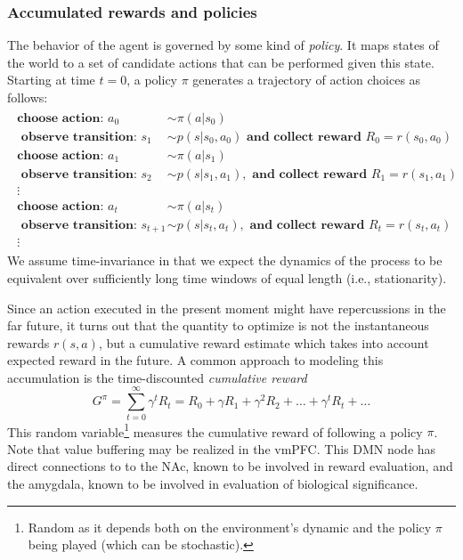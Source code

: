\documentclass[10pt,letterpaper]{article}
\begin{document}
\subsubsection{Accumulated rewards and policies}
The behavior of the agent is governed by some kind of \textit{policy}.
It maps states of the world to
a set of candidate actions that can be performed given this state. Starting at time $t=0$,
a policy $\pi$ generates a trajectory of action choices as follows:
\begin{eqnarray*}
  \begin{split}
    \textbf{choose action: }a_0 &\sim \pi(a|s_0)\\
    \textbf{ observe transition: }s_1 &\sim p(s|s_0,a_0)\textbf{ and collect reward }R_0 = r(s_0, a_0)\\
    \textbf{choose action: }a_1 &\sim \pi(a|s_1)\\
    \textbf{ observe transition: }s_2 &\sim p(s|s_1,a_1), \textbf{ and collect reward }R_1 = r(s_1, a_1)\\
    \vdots\\
    \textbf{choose action: }a_{t} &\sim \pi(a|s_{t})\\
    \textbf{ observe transition: }s_{t+1} &\sim p(s|s_{t},a_{t}), \textbf{ and collect reward }R_{t} = r(s_{t}, a_{t})\\
    \vdots
  \end{split}
\end{eqnarray*}
We assume time-invariance
in that we expect the dynamics of the process
to be equivalent over sufficiently long time windows of equal length (i.e., stationarity).



Since an action executed in the present moment might have repercussions in the far future, it turns out that the
quantity to optimize is not the instantaneous rewards $r(s, a)$, but a
cumulative reward estimate which takes into account expected reward in the future.
A common approach to
modeling this accumulation is the time-discounted \textit{cumulative reward}%
\begin{equation}
  \label{eq:cumr}
  G^\pi = \sum_{t=0}^{\infty}\gamma^{t}R_t = R_0 + \gamma R_1 + \gamma^2 R_2 + \ldots + \gamma^tR_t + \ldots
\end{equation}
This random variable\footnote{Random as it depends both on the environment's dynamic and the
  policy $\pi$ being played (which can be stochastic).}  measures the cumulative reward of
following a policy $\pi$.
%
Note that value buffering may be realized in the vmPFC.
This DMN node has direct connections to
to the NAc, known to be involved in reward evaluation,
and
the amygdala, known to be involved in evaluation of biological significance.
\end{document}

